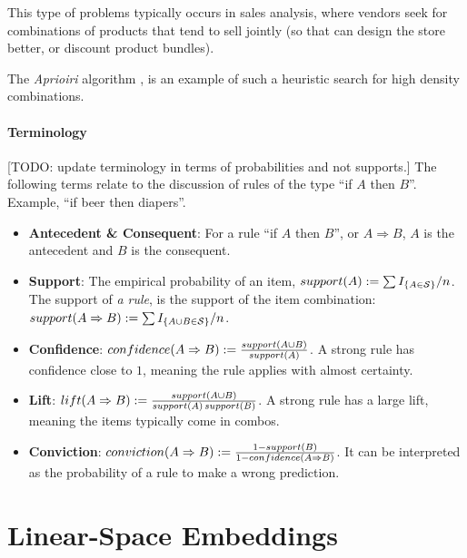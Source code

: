This type of problems typically occurs in sales analysis, where vendors seek for combinations of products that tend to sell jointly (so that can design the store better, or discount product bundles).

The \emph{Aprioiri} algorithm \cite{agraval_fast_1994}, is an example of such a heuristic search for high density combinations.

\paragraph{Terminology}
[TODO: update terminology in terms of probabilities and not supports.]
The following terms relate to the discussion of rules of the type ``if $A$ then $B$''. Example, ``if beer then diapers''.
\begin{itemize}
\item \textbf{Antecedent \& Consequent}: For a rule ``if $A$ then $B$'', or $A \Rightarrow B$, $A$ is the antecedent and $B$ is the consequent.
\item \textbf{Support}: The empirical probability of an item, $\mathop{support}(A):=\sum I_{\left\{ A \in \mathcal{S} \right\}}/n$. The support of \emph{a rule}, is the support of the item combination: $\mathop{support}(A \Rightarrow B):=\sum I_{\left\{ A \cup B \in \mathcal{S} \right\}}/n$.
\item \textbf{Confidence}: $\mathop{confidence}(A \Rightarrow B):=\frac{\mathop{support}(A \cup B)}{\mathop{support}(A)}$. A strong rule has confidence close to $1$, meaning the rule applies with almost certainty.
\item \textbf{Lift}: $\mathop{lift}(A \Rightarrow B):=\frac{\mathop{support}(A \cup B)}{\mathop{support}(A) \mathop{support}(B)}$. A strong rule has a large lift, meaning the items typically come in combos.
\item \textbf{Conviction}: $\mathop{conviction}(A \Rightarrow B):=\frac{1-\mathop{support}(B)}{1-\mathop{confidence}(A \Rightarrow B)}$. It can be interpreted as the probability of a rule to make a wrong prediction.
\end{itemize}

















\section{Linear-Space Embeddings}
\label{sec:dim_reduce_linear}

